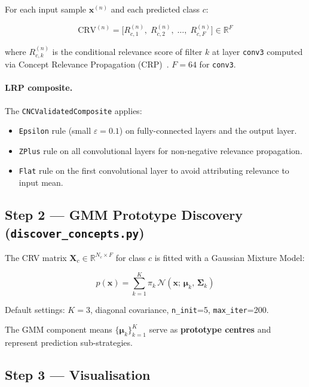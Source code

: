 \documentclass[11pt,a4paper]{article}
\begin{document}
For each input sample $\mathbf{x}^{(n)}$ and each predicted class $c$:

\begin{equation}
  \mathrm{CRV}^{(n)} = \bigl[R^{(n)}_{c,1},\; R^{(n)}_{c,2},\; \ldots,\;
                               R^{(n)}_{c,F}\bigr] \in \mathbb{R}^F
\end{equation}

where $R^{(n)}_{c,k}$ is the conditional relevance score of filter $k$ at
layer \texttt{conv3} computed via Concept Relevance Propagation (CRP)~\cite{crp}.
$F=64$ for \texttt{conv3}.

\paragraph{LRP composite.}
The \texttt{CNCValidatedComposite} applies:
\begin{itemize}
  \item \texttt{Epsilon} rule (small $\varepsilon = 0.1$) on fully-connected
        layers and the output layer.
  \item \texttt{ZPlus} rule on all convolutional layers for non-negative
        relevance propagation.
  \item \texttt{Flat} rule on the first convolutional layer to avoid
        attributing relevance to input mean.
\end{itemize}

\subsection{Step 2 — GMM Prototype Discovery (\texttt{discover\_concepts.py})}

The CRV matrix $\mathbf{X}_c \in \mathbb{R}^{N_c \times F}$ for class $c$ is
fitted with a Gaussian Mixture Model:

\begin{equation}
  p(\mathbf{x}) = \sum_{k=1}^{K} \pi_k\,
    \mathcal{N}\!\left(\mathbf{x};\,\boldsymbol{\mu}_k,\,\boldsymbol{\Sigma}_k\right)
\end{equation}

Default settings: $K=3$, diagonal covariance, \texttt{n\_init}=5,
\texttt{max\_iter}=200.

The GMM component means $\{\boldsymbol{\mu}_k\}_{k=1}^K$ serve as
\textbf{prototype centres} and represent prediction sub-strategies.

\subsection{Step 3 — Visualisation}
\end{document}
